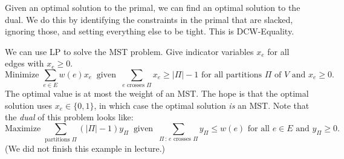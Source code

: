 \begin{remark}
    Given an optimal solution to the primal, we can find an optimal solution to the dual.  We do this by identifying the constraints in the primal that are slacked, ignoring those, and setting everything else to be tight.  This is DCW-Equality.
\end{remark}

We can use LP to solve the MST problem.  Give indicator variables $x_e$ for all edges with $x_e \geq 0$.
\[ \text{Minimize } \sum_{e \in E} w(e) x_e ~ \text{ given } ~ \sum_{e \text{ crosses } \Pi} x_e \geq |\Pi| - 1 \text{ for all partitions } \Pi \text{ of } V \text{ and } x_e \geq 0. \]
The optimal value is at most the weight of an MST.  The hope is that the optimal solution uses $x_e \in \{0, 1\}$, in which case the optimal solution \emph{is} an MST.  Note that the \emph{dual} of this problem looks like:
\[ \text{Maximize } \sum_{\text{partitions } \Pi} (|\Pi| - 1)y_{\Pi} ~ \text{ given } ~ \sum_{\Pi \, : \, e \text{ crosses } \Pi} y_{\Pi} \leq w(e) \text{ for all } e \in E \text{ and } y_{\Pi} \geq 0. \]
(We did not finish this example in lecture.)

